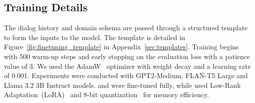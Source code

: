 



\vspace{-5pt}
\subsection{Training Details}
\vspace{-3pt}
The dialog history and domain schema are passed through a structured template to form the inputs to the model. 
The template is detailed in Figure~\ref{fig:finetuning_template} in Appendix~\ref{sec:templates}.
Training begins with 500 warm-up steps and early stopping on the evaluation loss with a patience value of 3.
We used the AdamW~\cite{Loshchilov2017DecoupledWD}  optimizer with weight decay and a learning rate of 0.001.
Experiments were conducted with GPT2-Medium, FLAN-T5 Large and Llama 3.2 3B Instruct models. 
{\gpt} and {\flan} were fine-tuned fully, while {\llamai} used Low-Rank Adaptation~(LoRA)~\cite{Hu2021LoRALA} and 8-bit quantization~\cite{jacob2018quantization} for memory efficiency.





